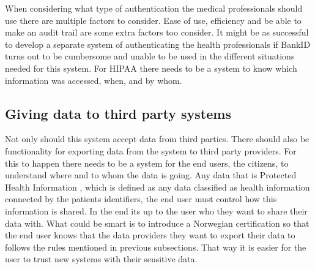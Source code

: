 When considering what type of authentication the medical professionals should use there are multiple factors to consider. 
Ease of use, efficiency and be able to make an audit trail are some extra factors too consider.
It might be as successful to develop a separate system of authenticating the health professionals if BankID turns out to be cumbersome and unable to be used in the different situations needed for this system. 
For HIPAA there needs to be a system to know which information was accessed, when, and by whom. \cite{Audit}

\subsection{Giving data to third party systems}
Not only should this system accept data from third parties. 
There should also be functionality for exporting data from the system to third party providers. 
For this to happen there needs to be a system for the end users, the citizens, to understand where and to whom the data is going.
Any data that is Protected Health Information \cite{PHI}, which is defined as any data classified as health information connected by the patients identifiers, the end user must control how this information is shared. 
In the end its up to the user who they want to share their data with.
What could be smart is to introduce a Norwegian certification so that the end user knows that the data providers they want to export their data to follows the rules mentioned in previous subsections. 
That way it is easier for the user to trust new systems with their sensitive data.
